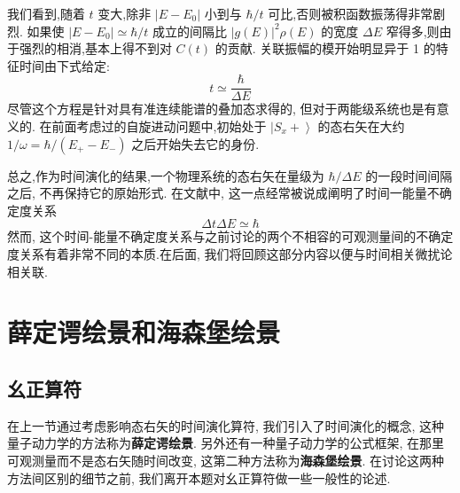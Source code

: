 我们看到,随着 $t$ 变大,除非 $\left| {E - {E}_{0}}\right|$ 小到与 $\hbar /t$ 可比,否则被积函数振荡得非常剧烈. 如果使 $\left| {E - {E}_{0}}\right| \simeq \hbar /t$ 成立的间隔比 ${\left| g\left( E\right) \right| }^{2}\rho \left( E\right)$ 的宽度 ${\Delta E}$ 窄得多,则由于强烈的相消,基本上得不到对 $C\left( t\right)$ 的贡献. 关联振幅的模开始明显异于 1 的特征时间由下式给定:
\begin{equation}
	t \simeq \frac{\hbar }{\Delta E}
\end{equation}
尽管这个方程是针对具有准连续能谱的叠加态求得的, 但对于两能级系统也是有意义的. 在前面考虑过的自旋进动问题中,初始处于 $\left| {{S}_{x} + }\right\rangle$ 的态右矢在大约 $1/\omega = \hbar /\left( {{E}_{ + } - {E}_{ - }}\right)$ 之后开始失去它的身份.

总之,作为时间演化的结果,一个物理系统的态右矢在量级为 $\hbar /{\Delta E}$ 的一段时间间隔之后, 不再保持它的原始形式. 在文献中, 这一点经常被说成阐明了时间一能量不确定度关系
\begin{equation}
	{\Delta t\Delta E} \simeq \hbar
\end{equation}
然而, 这个时间-能量不确定度关系与之前讨论的两个不相容的可观测量间的不确定度关系有着非常不同的本质.在后面, 我们将回顾这部分内容以便与时间相关微扰论相关联.
\section{薛定谔绘景和海森堡绘景}
\subsection{幺正算符}
在上一节通过考虑影响态右矢的时间演化算符, 我们引入了时间演化的概念, 这种量子动力学的方法称为\textbf{薛定谔绘景}. 另外还有一种量子动力学的公式框架, 在那里可观测量而不是态右矢随时间改变, 这第二种方法称为\textbf{海森堡绘景}. 在讨论这两种方法间区别的细节之前, 我们离开本题对幺正算符做一些一般性的论述.

